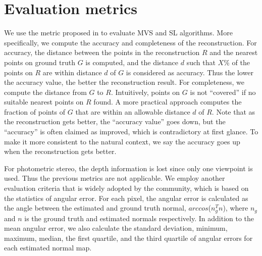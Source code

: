\section{Evaluation metrics}
We use the metric proposed in \cite{seitz2006comparison} to evaluate MVS and SL algorithms. More specifically, we compute the accuracy and completeness of the reconstruction. For accuracy, the distance between the points in the reconstruction $R$ and the nearest points on ground truth $G$ is computed, and the distance $d$ such that $X\%$ of the points on $R$ are within distance $d$ of $G$ is considered as accuracy. Thus the lower the accuracy value, the better the reconstruction result. For completeness, we compute the distance from $G$ to $R$. Intuitively, points on $G$ is not ``covered'' if no suitable nearest points on $R$ found. A more practical approach computes the fraction of points of $G$ that are within an allowable distance $d$ of $R$.
Note that as the reconstruction gets better, the ``accuracy value'' goes down, but the ``accuracy'' is often claimed as improved, which is contradictory at first glance. To make it more consistent to the natural context, we say the accuracy goes up when the reconstruction gets better.

For photometric stereo, the depth information is lost since only one viewpoint is used. Thus the previous metrics are not applicable. We employ another evaluation criteria that is widely adopted by the community, which is based on the statistics of angular error. For each pixel, the angular error is calculated as the angle between the estimated and ground truth normal, \ie $arccos$($n_g^T n$), where $n_g$ and $n$ is the ground truth and estimated normals respectively. In addition to the mean angular error, we also calculate the standard deviation, minimum, maximum, median, the first quartile, and the third quartile of angular errors for each estimated normal map.

